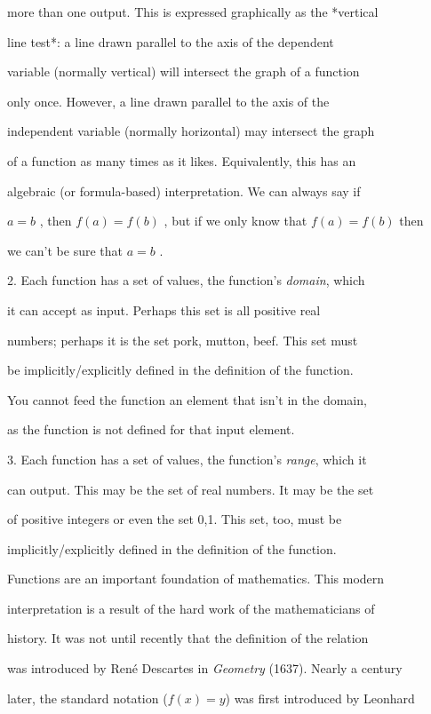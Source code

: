    more than one output. This is expressed graphically as the *vertical

    line test*: a line drawn parallel to the axis of the dependent

    variable (normally vertical) will intersect the graph of a function

    only once. However, a line drawn parallel to the axis of the

    independent variable (normally horizontal) may intersect the graph

    of a function as many times as it likes. Equivalently, this has an

    algebraic (or formula-based) interpretation. We can always say if

    $a=b$ , then $f(a)=f(b)$ , but if we only know that $f(a)=f(b)$ then

    we can't be sure that $a=b$ .

2.  Each function has a set of values, the function's \textit{domain}, which

    it can accept as input. Perhaps this set is all positive real

    numbers; perhaps it is the set {pork, mutton, beef}. This set must

    be implicitly/explicitly defined in the definition of the function.

    You cannot feed the function an element that isn't in the domain,

    as the function is not defined for that input element.

3.  Each function has a set of values, the function's \textit{range}, which it

    can output. This may be the set of real numbers. It may be the set

    of positive integers or even the set {0,1}. This set, too, must be

    implicitly/explicitly defined in the definition of the function.



Functions are an important foundation of mathematics. This modern

interpretation is a result of the hard work of the mathematicians of

history. It was not until recently that the definition of the relation

was introduced by René Descartes in \textit{Geometry} (1637). Nearly a century

later, the standard notation ($f(x)=y$) was first introduced by Leonhard


